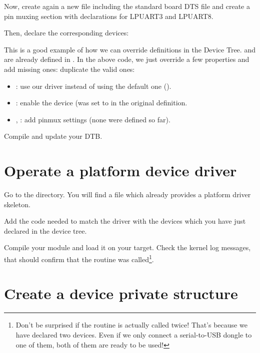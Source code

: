 Now, create again a new
 file including
the standard board DTS file and create a pin muxing section with
declarations for LPUART3 and LPUART8.

{\scriptsize {}}

Then, declare the corresponding devices:


This is a good example of how we can override definitions in the Device
Tree.  and  are already defined in
. In the above code, we just
override a few properties and add missing ones:
duplicate the valid ones:

\begin{itemize}
\item {}: use our driver instead of using the default one
      ().
\item {}: enable the device (was set to  in
      the original definition.
\item {}, : add pinmux settings
      (none were defined so far).
\end{itemize}

Compile and update your DTB.

\section{Operate a platform device driver}

Go to the  directory.
You will find a  file which already provides a platform
driver skeleton.

Add the code needed to match the driver with the devices which you have
just declared in the device tree.

Compile your module and load it on your target. Check the kernel log
messages, that should confirm that the  routine was
called\footnote{Don't be surprised if the  routine is
actually called twice! That's because we have declared two devices.
Even if we only connect a serial-to-USB dongle to one of them, both
of them are ready to be used!}.

\section{Create a device private structure}

